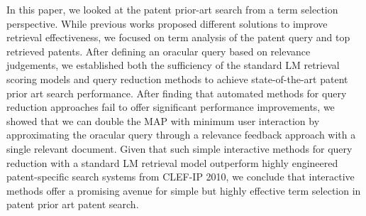 In this paper, we looked at the patent prior-art search from a term
selection perspective.  While previous works proposed different
solutions to improve retrieval effectiveness, we focused on term
analysis of the patent query and top retrieved patents.  After
defining an oracular query based on relevance judgements, we
established both the sufficiency of the standard LM retrieval scoring
models and query reduction methods to achieve state-of-the-art patent
prior art search performance.  After finding that automated methods
for query reduction approaches fail to offer significant performance
improvements,
we showed that we can double the MAP with minimum user interaction by
approximating the oracular query through a relevance feedback approach
with a single relevant document.  Given that such simple interactive
methods for query reduction with a standard LM retrieval model
outperform highly engineered patent-specific search systems from
CLEF-IP 2010, we conclude that interactive methods offer a promising
avenue for simple but highly effective term selection in patent prior
art patent search.




